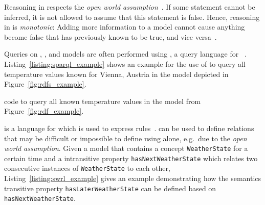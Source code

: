 Reasoning in  respects the \emph{open world assumption}~\cite{open_world_assumption1,open_world_assumption2}. If some statement cannot be inferred, it is not allowed to assume that this statement is false. Hence, reasoning in  is \emph{monotonic}: Adding more information to a model cannot cause anything become false that has previously known to be true, and vice versa~\cite{MonotonicReasoning}.

Queries on , , and  models are often performed using , a query language for ~\cite{SPARQL}. Listing~\ref{listing:sparql_example} shows an example for the use of  to query all temperature values known for Vienna, Austria in the  model depicted in Figure~\ref{fig:rdfs_example}.

\begin{mintlisting}

\caption[Example  query]{ code to query all known temperature values in the model from Figure~\ref{fig:rdf_example}.}
\label{listing:sparql_example}
\end{mintlisting}

 is a language for  which is used to express rules~\cite{SWRL}.  can be used to define relations that may be difficult or impossible to define using  alone, e.g.\ due to the \emph{open world assumption}. Given a model that contains a concept \texttt{WeatherState} for a certain time and a intransitive property \texttt{hasNextWeatherState} which relates two consecutive instances of \texttt{WeatherState} to each other, Listing~\ref{listing:swrl_example} gives an example demonstrating how the semantics transitive property \texttt{hasLaterWeatherState} can be defined based on \texttt{hasNextWeatherState}.

